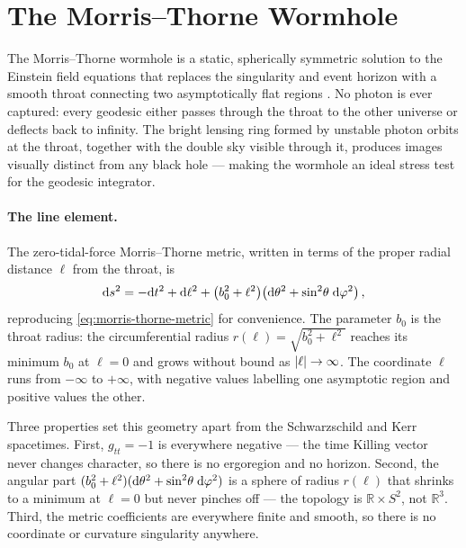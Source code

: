 \section{The Morris--Thorne Wormhole\starmark{}}
\label{sec:kerr-wormhole}

The Morris--Thorne wormhole is a static, spherically symmetric
solution to the Einstein field equations that replaces the
singularity and event horizon with a smooth throat connecting two
asymptotically flat regions \cite{MorrisThorne1988}.  No photon is
ever captured: every geodesic either passes through the throat to the
other universe or deflects back to infinity.  The bright lensing ring
formed by unstable photon orbits at the throat, together with the
double sky visible through it, produces images visually distinct from
any black hole --- making the wormhole an ideal stress test for the
geodesic integrator.

\paragraph{The line element.}

The zero-tidal-force Morris--Thorne metric, written in terms of the
proper radial distance $\ell$ from the throat, is
%
\begin{equation}
  \mathrm{d} s^2 = -\mathrm{d} t^2 + \mathrm{d}\ell^2
    + \bigl(b_0^2 + \ell^2\bigr)
      \bigl(\mathrm{d}\theta^2 + \sin^2\!\theta\;\mathrm{d}\varphi^2\bigr) \,,
  \label{eq:mt-metric}
\end{equation}
%
reproducing \cref{eq:morris-thorne-metric} for convenience.  The
parameter $b_0$ is the throat radius: the circumferential radius
$r(\ell) = \sqrt{b_0^2 + \ell^2}$ reaches its minimum $b_0$ at
$\ell = 0$ and grows without bound as $\left\lvert \ell \right\rvert \to \infty$.
The coordinate $\ell$ runs from $-\infty$ to $+\infty$, with
negative values labelling one asymptotic region and positive values
the other.

Three properties set this geometry apart from the Schwarzschild
and Kerr spacetimes.  First, $g_{tt} = -1$ is everywhere negative
--- the time Killing vector never changes character, so there is no
ergoregion and no horizon.
Second, the angular part
$(b_0^2 + \ell^2)(\mathrm{d}\theta^2 + \sin^2\!\theta\;\mathrm{d}\varphi^2)$ is a
sphere of radius $r(\ell)$ that shrinks to a minimum at $\ell = 0$
but never pinches off --- the topology is
$\mathbb{R} \times S^2$, not $\mathbb{R}^3$.  Third, the metric
coefficients are everywhere finite and smooth, so there is no
coordinate or curvature singularity anywhere.

